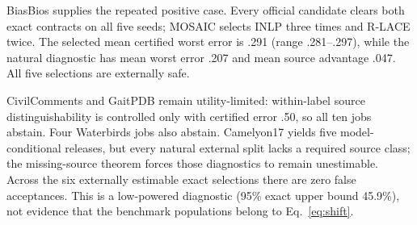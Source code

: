BiasBios supplies the repeated positive case. Every official candidate clears
both exact contracts on all five seeds; MOSAIC selects INLP three times and
R-LACE twice. The selected mean certified worst error is .291 (range
.281--.297), while the natural diagnostic has mean worst error .207 and mean
source advantage .047. All five selections are externally safe.

CivilComments and GaitPDB remain utility-limited: within-label source distinguishability is controlled only with
certified error .50, so all ten jobs abstain. Four Waterbirds jobs also abstain.
Camelyon17 yields five model-conditional releases, but every natural external
split lacks a required source class; the missing-source theorem forces those
diagnostics to remain unestimable. Across the six externally estimable exact
selections there are zero false acceptances. This is a low-powered diagnostic
(95\% exact upper bound 45.9\%), not evidence that the benchmark populations
belong to Eq.~\eqref{eq:shift}.
